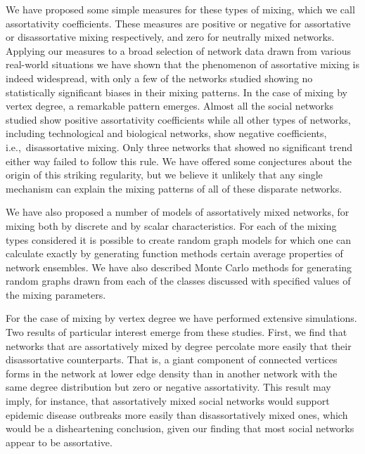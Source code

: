 \documentclass[twocolumn,pre]{revtex4}
\begin{document}
We have proposed some simple measures for these types of mixing, which we
call assortativity coefficients.  These measures are positive or negative
for assortative or disassortative mixing respectively, and zero for
neutrally mixed networks.  Applying our measures to a broad selection of
network data drawn from various real-world situations we have shown that
the phenomenon of assortative mixing is indeed widespread, with only a few
of the networks studied showing no statistically significant biases in
their mixing patterns.  In the case of mixing by vertex degree, a
remarkable pattern emerges.  Almost all the social networks studied show
positive assortativity coefficients while all other types of networks,
including technological and biological networks, show negative
coefficients, i.e.,~disassortative mixing.  Only three networks that showed
no significant trend either way failed to follow this rule.  We have
offered some conjectures about the origin of this striking regularity, but
we believe it unlikely that any single mechanism can explain the mixing
patterns of all of these disparate networks.

We have also proposed a number of models of assortatively mixed networks,
for mixing both by discrete and by scalar characteristics.  For each of the
mixing types considered it is possible to create random graph models for
which one can calculate exactly by generating function methods certain
average properties of network ensembles.  We have also described Monte
Carlo methods for generating random graphs drawn from each of the classes
discussed with specified values of the mixing parameters.

For the case of mixing by vertex degree we have performed extensive
simulations.  Two results of particular interest emerge from these studies.
First, we find that networks that are assortatively mixed by degree
percolate more easily that their disassortative counterparts.  That is, a
giant component of connected vertices forms in the network at lower edge
density than in another network with the same degree distribution but zero
or negative assortativity.  This result may imply, for instance, that
assortatively mixed social networks would support epidemic disease
outbreaks more easily than disassortatively mixed ones, which would be a
disheartening conclusion, given our finding that most social networks
appear to be assortative.
\end{document}
